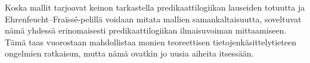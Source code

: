 \documentclass[finnish]{tktltiki2}
\theoremstyle{definition}
\theoremstyle{remark}
\begin{document}
Koska mallit tarjoavat keinon tarkastella predikaattilogiikan lauseiden totuutta ja Ehrenfeucht--Fraïssé-pelillä voidaan mitata mallien samankaltaisuutta, soveltuvat nämä yhdessä erinomaisesti  predikaattilogiikan ilmaisuvoiman mittaamiseen. Tämä taas vuorostaan mahdollistaa monien teoreettisen tietojenkäsittelytieteen ongelmien ratkaisun, mutta nämä ovatkin jo uusia aiheita itsessään.
%
%
% 
%

%
%




% 
\end{document}
